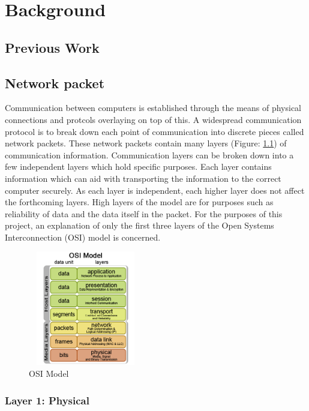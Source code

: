 \chapter{Background}\label{C:back}

\section{Previous Work}

\section{Network packet}

\par Communication between computers is established through the means of physical connections and protcols overlaying on top of this. 
A widespread communication protocol is to break down each point of communication into discrete pieces called network packets.
These network packets contain many layers (Figure: \ref{fig:OSIModel}) of communication information.
Communication layers can be broken down into a few independent layers which hold specific purposes. 
Each layer contains information which can aid with transporting the information to the correct computer securely.
As each layer is independent, each higher layer does not affect the forthcoming layers.
High layers of the model are for purposes such as reliability of data and the data itself in the packet.
For the purposes of this project, an explanation of only the first three layers of the Open Systems Interconnection (OSI) model is concerned.

\begin{figure}[H]
    \begin{center}
        \includegraphics[width=5cm,height=5cm,keepaspectratio]{Images/OSIModel.png}
        \caption{OSI Model}
        \label{fig:OSIModel}
    \end{center}
\end{figure}

\subsection{Layer 1: Physical}


